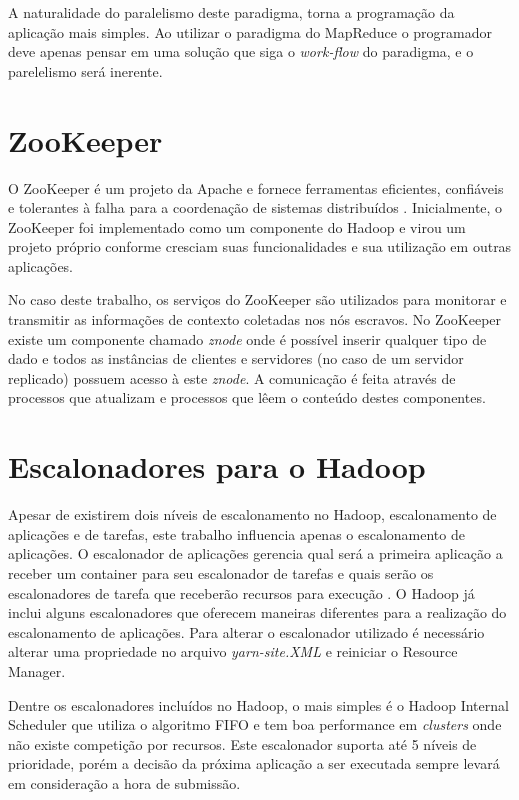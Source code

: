 A naturalidade do paralelismo deste paradigma, torna a programação da aplicação mais simples. Ao utilizar o paradigma do MapReduce o programador deve apenas pensar em uma solução que siga o \textit{work-flow} do paradigma, e o parelelismo será inerente.

\section{ZooKeeper}
O ZooKeeper é um projeto da Apache e fornece ferramentas eficientes, confiáveis e tolerantes à falha para a coordenação de sistemas distribuídos \cite{Hunt2010}. Inicialmente, o ZooKeeper foi implementado como um componente do Hadoop e virou um projeto próprio conforme cresciam suas funcionalidades e sua utilização em outras aplicações. 

No caso deste trabalho, os serviços do ZooKeeper são utilizados para monitorar e transmitir as informações de contexto coletadas nos nós escravos. No ZooKeeper existe um componente chamado \textit{znode} onde é possível inserir qualquer tipo de dado e todos as instâncias de clientes e servidores (no caso de um servidor replicado) possuem acesso à este \textit{znode}. A comunicação é feita através de processos que atualizam e processos que lêem o conteúdo destes componentes.



\section{Escalonadores para o Hadoop}
\label{sec:HadSched}
Apesar de existirem dois níveis de escalonamento no Hadoop, escalonamento de aplicações e de tarefas, este trabalho influencia apenas o escalonamento de aplicações. O escalonador de aplicações gerencia qual será a primeira aplicação a receber um container para seu escalonador de tarefas e quais serão os escalonadores de tarefa que receberão recursos para execução \cite{BookHadoop}. O Hadoop já inclui alguns escalonadores que oferecem maneiras diferentes para a realização do escalonamento de aplicações. Para alterar o escalonador utilizado é necessário alterar uma propriedade no arquivo \textit{yarn-site.XML} e reiniciar o Resource Manager.

Dentre os escalonadores incluídos no Hadoop, o mais simples é o Hadoop Internal Scheduler que utiliza o algoritmo FIFO e tem boa performance em \textit{clusters} onde não existe competição por recursos. Este escalonador suporta até 5 níveis de prioridade, porém a decisão da próxima aplicação a ser executada sempre levará em consideração a hora de submissão.

